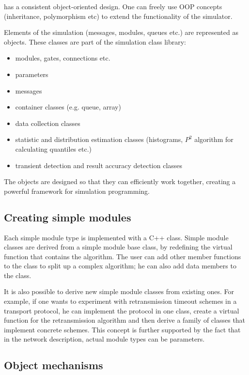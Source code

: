 {\opp} has a consistent object-oriented design. One can freely 
use OOP concepts (inheritance, polymorphism etc) to extend the 
functionality of the simulator.

Elements of the simulation (messages, modules, queues etc.) are 
represented as objects. These classes are part of the simulation 
class library:
\begin{itemize}
\item{modules, gates, connections etc.}
\item{parameters}
\item{messages}
\item{container classes (e.g. queue, array)}
\item{data collection classes}
\item{statistic and distribution estimation classes (histograms, $P^{2}$ 
algorithm for calculating quantiles etc.)}
\item{transient detection and result accuracy detection classes}
\end{itemize}

The objects are designed so that they can efficiently work together, 
creating a powerful framework for simulation programming.


\subsection{Creating simple modules}

Each simple module type is implemented with a C++ class. Simple 
module classes are derived from a simple module base class, by 
redefining the virtual function that contains the algorithm. 
The user can add other member functions to the class to split 
up a complex algorithm; he can also add data members to the class. 

It is also possible to derive new simple module classes from 
existing ones. For example, if one wants to experiment with retransmission 
timeout schemes in a transport protocol, he can implement the 
protocol in one class, create a virtual function for the retransmission 
algorithm and then derive a family of classes that implement 
concrete schemes. This concept is further supported by the fact 
that in the network description, actual module types can be parameters.


\subsection{Object mechanisms}

